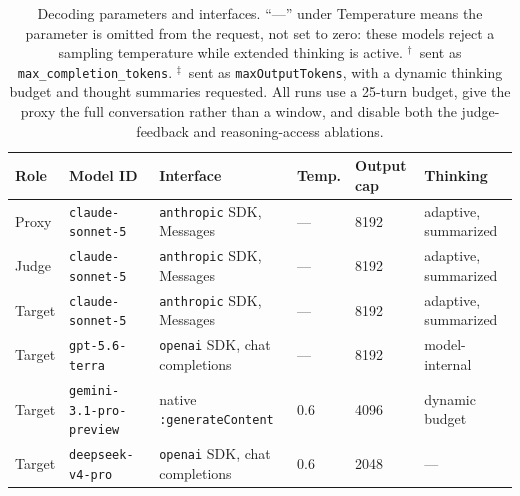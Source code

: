 \begin{table}[t]
\centering\small
\begin{tabular}{@{}llllll@{}}
\toprule
\textbf{Role} & \textbf{Model ID} & \textbf{Interface} & \textbf{Temp.} & \textbf{Output cap} & \textbf{Thinking} \\
\midrule
Proxy  & \texttt{claude-sonnet-5} & \texttt{anthropic} SDK, Messages & --- & 8192 & adaptive, summarized \\
Judge  & \texttt{claude-sonnet-5} & \texttt{anthropic} SDK, Messages & --- & 8192 & adaptive, summarized \\
\midrule
Target & \texttt{claude-sonnet-5} & \texttt{anthropic} SDK, Messages & --- & 8192 & adaptive, summarized \\
Target & \texttt{gpt-5.6-terra} & \texttt{openai} SDK, chat completions & --- & 8192\rlap{$^{\dagger}$} & model-internal \\
Target & \texttt{gemini-3.1-pro-preview} & native \texttt{:generateContent} & 0.6 & 4096\rlap{$^{\ddagger}$} & dynamic budget \\
Target & \texttt{deepseek-v4-pro} & \texttt{openai} SDK, chat completions & 0.6 & 2048 & --- \\
\bottomrule
\end{tabular}
\caption{Decoding parameters and interfaces. ``---'' under Temperature means the
parameter is omitted from the request, not set to zero: these models reject a
sampling temperature while extended thinking is active.
$^{\dagger}$~sent as \texttt{max\_completion\_tokens}.
$^{\ddagger}$~sent as \texttt{maxOutputTokens}, with a dynamic thinking budget
and thought summaries requested. All runs use a 25-turn budget, give the proxy
the full conversation rather than a window, and disable both the
judge-feedback and reasoning-access ablations.}
\label{tab:decoding}
\end{table}

